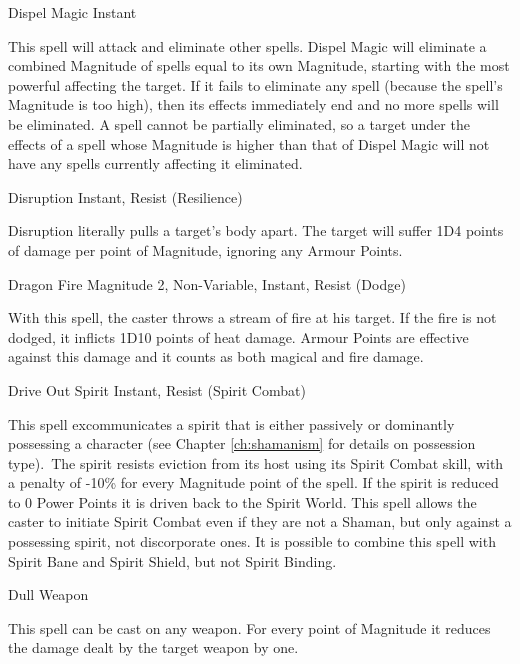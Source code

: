 \begin{rpg-spell}
{Dispel Magic}
{Instant}

This spell will attack and eliminate other spells. Dispel Magic will eliminate a combined Magnitude of spells equal to its own Magnitude, starting with the most powerful affecting the target. If it fails to eliminate any spell (because the spell’s Magnitude is too high), then its effects immediately end and no more spells will be eliminated. A spell cannot be partially eliminated, so a target under the effects of a spell whose Magnitude is higher than that of Dispel Magic will not have any spells currently affecting it eliminated. 
\end{rpg-spell}


\begin{rpg-spell}
{Disruption}
{Instant, Resist (Resilience)}

Disruption literally pulls a target’s body apart. The target will suffer 1D4 points of damage per point of Magnitude, ignoring any Armour Points. 
\end{rpg-spell}


\begin{rpg-spell}
{Dragon Fire}
{Magnitude 2, Non-Variable, Instant, Resist (Dodge)}

With this spell, the caster throws a stream of fire at his target. If the fire is not dodged, it inflicts 1D10 points of heat damage. Armour Points are effective against this damage and it counts as both magical and fire damage.
\end{rpg-spell}


\begin{rpg-spell}
{Drive Out Spirit}
{Instant, Resist (Spirit Combat)}

This spell excommunicates a spirit that is either passively or dominantly possessing a character (see Chapter \ref{ch:shamanism} for details on possession type). The spirit resists eviction from its host using its Spirit Combat skill, with a penalty of -10\% for every Magnitude point of the spell. If the spirit is reduced to 0 Power Points it is driven back to the Spirit World. This spell allows the caster to initiate Spirit Combat even if they are not a Shaman, but only against a possessing spirit, not discorporate ones. It is possible to combine this spell with Spirit Bane and Spirit Shield, but not Spirit Binding.
\end{rpg-spell}


\begin{rpg-spell}
{Dull Weapon}
{}

This spell can be cast on any weapon. For every point of Magnitude it reduces the damage dealt by the target weapon by one. 
\end{rpg-spell}


